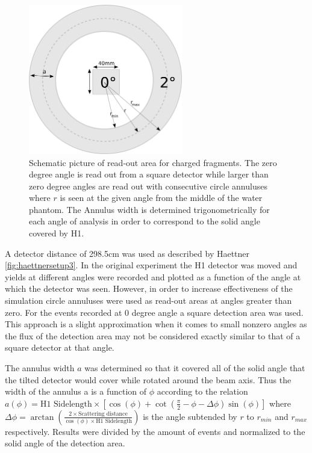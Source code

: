 \begin{figure}[!h] 
\begin{center}
\includegraphics[width=0.6\textwidth]{images/annulus.png}  
\caption{\label{fig:annulusesExplained} Schematic picture of read-out area for charged fragments. The zero degree angle is read out from a square detector while larger than zero degree angles are read out with consecutive circle annuluses where $r$ is seen at the given angle from the middle of the water phantom. The Annulus width is determined trigonometrically for each angle of analysis in order to correspond to the solid angle covered by H1.}
\end{center}
\end{figure}

A detector distance of 298.5cm was used as described by Haettner \ref{fig:haettnersetup3}. In the original experiment the H1 detector was moved and yields at different angles were recorded and plotted as a function of the angle at which the detector was seen. However, in order to increase effectiveness of the simulation circle annuluses were used as read-out areas at angles greater than zero. For the events recorded at 0 degree angle a square detection area was used. This approach is a slight approximation when it comes to small nonzero angles as the flux of the detection area may not be considered exactly similar to that of a square detector at that angle.

The annulus width $a$ was determined so that it covered all of the solid angle that the tilted detector would cover while rotated around the beam axis. Thus the width of the annulus a is a function of $\phi$ according to the relation $a(\phi) = \text{H1 Sidelength} \times [\cos(\phi)+ \cot(\frac{\pi}{2} - \phi - \Delta\phi)\sin(\phi)]$ where $\Delta\phi = \arctan(\frac{2 \times \text{Scattering distance}}{\cos(\phi) \times \text{H1 Sidelength}})$ is the angle subtended by $r$ to $r_{min}$ and $r_{max}$ respectively.
Results were divided by the amount of events and normalized to the solid angle of the detection area.

